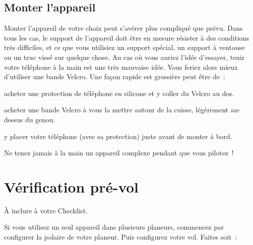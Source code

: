 \documentclass[french, a4paper, 12pt]{refrep}
\begin{document}
\subsection{\textcolor{flashblue}{Monter l'appareil}}
Monter l'appareil de votre choix peut s'avérer plus compliqué que
prévu. Dans tous les cas, le support de l'appareil doit être en mesure résister à des conditions très difficiles,
et ce que vous utilisiez un support spécial, un support à ventouse ou un truc vissé sur quelque chose.
Au cas où vous auriez l'idée d'essayer, tenir votre téléphone à la main est une très
mauvaise idée. Vous feriez alors mieux d'utiliser une bande Velcro. Une
façon rapide est grossière peut être de~:
\begin{compactitem}
\item acheter une protection de téléphone en silicone et y coller du Velcro au dos.
\item acheter une bande Velcro à vous la mettre autour de la cuisse, légèrement au-dessus du genou.
\item y placer votre téléphone (avec sa protection) juste avant de monter à bord.
\end{compactitem}
Ne tenez jamais à la main un appareil complexe pendant que vous pilotez~!


\section{Vérification pré-vol}


À inclure à votre Checklist.

Si vous utilisez un seul appareil \xc{} dans plusieurs planeurs, commencez par configurer la
polaire de votre planeur. Puis configurez votre vol.
Faites soit~:
\end{document}
